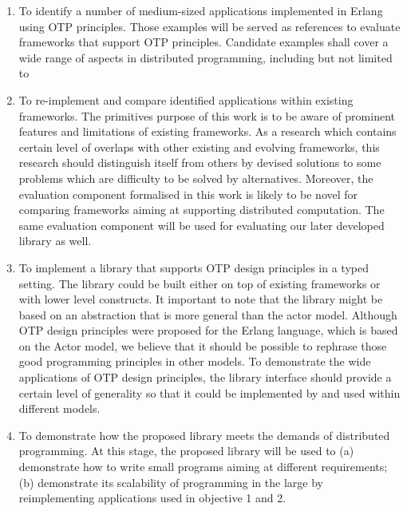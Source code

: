 \begin{enumerate}
  \item To identify a number of medium-sized applications implemented in Erlang using OTP principles.  Those examples will be served as references to evaluate frameworks that support OTP principles.  Candidate examples shall cover a wide range of aspects in distributed programming, including but not limited to 
  \item To re-implement and compare identified applications within existing frameworks.  The primitives purpose of this work is to be aware of prominent features and limitations of existing frameworks.  As a research which contains certain level of overlaps with other existing and evolving frameworks, this research should distinguish itself from others by devised solutions to some problems which are difficulty to be solved by alternatives.  Moreover, the evaluation component formalised in this work is likely to be novel for comparing frameworks aiming at supporting distributed computation.  The same evaluation component will be used for evaluating our later developed library as well.
  \item To implement a library that supports OTP design principles in a typed setting.  The library could be built either on top of existing frameworks or with lower level constructs.  It important to note that the library might be based on an abstraction that is more general than the actor model.  Although OTP design principles were proposed for the Erlang language, which is based on the Actor model, we believe that it should be possible to rephrase those good programming principles in other models.  To demonstrate the wide applications of OTP design principles, the library interface should provide a certain level of generality so that it could be implemented by and used within different models.
  \item To demonstrate how the proposed library meets the demands of distributed programming.  At this stage, the proposed library will be used to (a) demonstrate how to write small programs aiming at different requirements; (b) demonstrate its scalability of programming in the large by reimplementing applications used in objective 1 and 2.

\end{enumerate}
